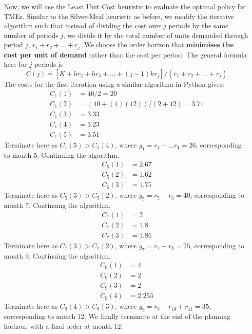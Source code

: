 \documentclass[12pt]{article}
\begin{document}
Now, we will use the Least Unit Cost heuristic to evaluate the optimal policy for TMEs. Similar to the Silver-Meal heuristic as before, we modify the iterative algorithm such that instead of dividing the cost over $j$ periods by the same number of periods $j$, we divide it by the total number of units demanded through period $j$, $r_{1} + r_{2} + \dots + r_j$. We choose the order horizon that \textbf{minimises the cost per unit of demand} rather than the cost per period. The general formula here for $j$ periods is \begin{equation}
    C(j) = \left[ K + h r_{2} + h r_{3} + \dots + (j-1) h r_j \right] / (r_{1} + r_{2} + \dots + r_j)
\end{equation} The costs for the first iteration using a similar algorithm in Python gives: \begin{align*}
    C_{1}(1) &= 40 / 2 = 20 \\ 
    C_{1}(2) &= (40 + (1)(12)) / (2 + 12) = 3.71 \\ 
    C_{1}(3) &= 3.33 \\ 
    C_{1}(4) &= 3.23 \\ 
    C_{1}(5) &= 3.51  
\end{align*} Terminate here as $C_{1}(5) > C_{1}(4)$, where $y_{1} = r_{1} + \dots r_{4} = 26$, corresponding to month 5. Continuing the algorithm, \begin{align*}
    C_{5}(1) &= 2.67 \\ 
    C_{5}(2) &= 1.62 \\ 
    C_{5}(3) &= 1.75 
\end{align*} Terminate here as $C_{5}(3) > C_{5}(2)$, where $y_{5} = r_{5} + r_{6} = 40$, corresponding to month 7. Continuing the algorithm, \begin{align*}
    C_{7}(1) &= 2 \\ 
    C_{7}(2) &= 1.8 \\ 
    C_{7}(3) &= 1.86
\end{align*} Terminate here as $C_{7}(3) > C_{7}(2)$, where $y_{7} = r_{7} + r_{8} = 25$, corresponding to month 9. Continuing the algorithm, \begin{align*}
    C_{9}(1) &= 4 \\ 
    C_{9}(2) &= 2 \\ 
    C_{9}(3) &= 2 \\ 
    C_{9}(4) &= 2.255
\end{align*} Terminate here as $C_{9}(4) > C_{9}(3)$, where $y_{9} = r_{9} + r_{10} + r_{11}= 35$, corresponding to month 12. We finally terminate at the end of the planning horizon, with a final order at month 12: \begin{equation*}

\end{equation*}
\end{document}
